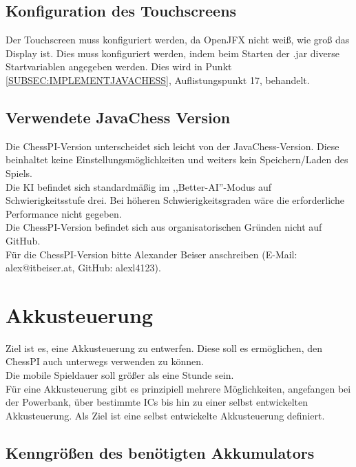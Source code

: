 \documentclass[12pt,a4paper]{article}
\begin{document}
\subsection{Konfiguration des Touchscreens}
\label{SUBSEC:SCREENCONFIG}

Der Touchscreen muss konfiguriert werden, da OpenJFX nicht weiß, wie groß das Display ist. Dies muss konfiguriert werden, indem beim Starten der .jar diverse Startvariablen angegeben werden. Dies wird in Punkt \ref{SUBSEC:IMPLEMENTJAVACHESS}, Auflistungspunkt 17, behandelt.

\subsection{Verwendete JavaChess Version}
\label{SUBSEC:USEDJAVACHESS}

Die ChessPI-Version unterscheidet sich leicht von der JavaChess-Version. Diese beinhaltet keine Einstellungsmöglichkeiten und weiters kein Speichern/Laden des Spiels.\\
Die KI befindet sich standardmäßig im ,,Better-AI''-Modus auf Schwierigkeitsstufe drei. Bei höheren Schwierigkeitsgraden wäre die erforderliche Performance nicht gegeben.\\[2ex]
Die ChessPI-Version befindet sich aus organisatorischen Gründen nicht auf GitHub. \\Für die ChessPI-Version bitte Alexander Beiser anschreiben (E-Mail: alex@itbeiser.at, GitHub: alexl4123).

\clearpage\vfill\newpage{}
\section{Akkusteuerung}
\label{SEC:AKKUSTEUR}

Ziel ist es, eine Akkusteuerung zu entwerfen. Diese soll es ermöglichen, den ChessPI auch unterwegs verwenden zu können. \\
Die mobile Spieldauer soll größer als eine Stunde sein. \\[1ex]
Für eine Akkusteuerung gibt es prinzipiell mehrere Möglichkeiten, angefangen bei der Powerbank, über bestimmte ICs bis hin zu einer selbst entwickelten Akkusteuerung. Als Ziel ist eine selbst entwickelte Akkusteuerung definiert.\\

\subsection{Kenngrößen des benötigten Akkumulators}
\label{SUBSEC:AKKU-NEEDS}
\end{document}
